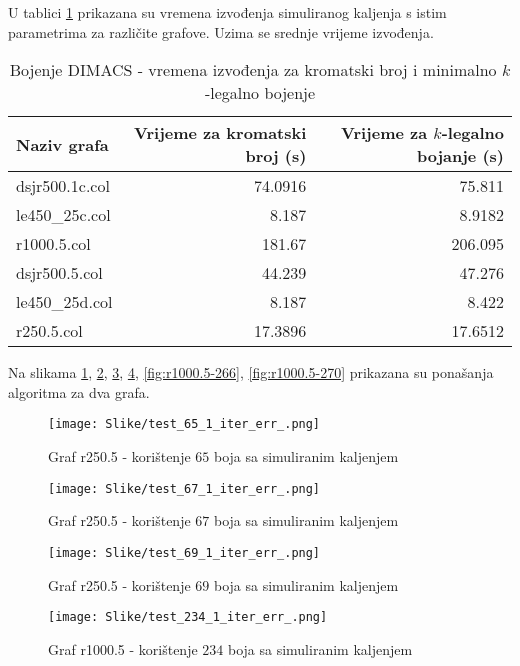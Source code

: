 \documentclass[times, utf8, diplomski, numeric]{fer}
\begin{document}
U tablici \ref{tbl:dimacs-sa-time} prikazana su vremena izvođenja simuliranog kaljenja s istim parametrima za različite grafove. Uzima se srednje vrijeme izvođenja.

\begin{table}[htb]
	\caption{Bojenje DIMACS - vremena izvođenja za kromatski broj i minimalno $k$-legalno bojenje}
	\label{tbl:dimacs-sa-time}
	\centering
	\begin{tabular}{|l||r|r|} \hline
	Naziv grafa & Vrijeme za kromatski broj (s) & Vrijeme za $k$-legalno bojanje (s) \\ \hline \hline
	dsjr500.1c.col & 74.0916 & 75.811 \\ \hline 
	le450\_25c.col & 8.187 & 8.9182 \\  \hline
	r1000.5.col & 181.67 & 206.095 \\ \hline
	dsjr500.5.col & 44.239 & 47.276  \\  \hline 
	le450\_25d.col &  8.187 & 8.422  \\ \hline
	r250.5.col & 17.3896 & 17.6512 \\ \hline
	\end{tabular}
\end{table}

Na slikama \ref{fig:r250.5-65}, \ref{fig:r250.5-67}, \ref{fig:r250.5-69}, \ref{fig:r1000.5-234}, \ref{fig:r1000.5-266}, \ref{fig:r1000.5-270} prikazana su ponašanja algoritma za dva grafa.

\begin{figure}[htb]
	\texttt{[image: Slike/test\_65\_1\_iter\_err\_.png]}
	\caption{Graf r250.5 - korištenje $65$ boja sa simuliranim kaljenjem}
	\label{fig:r250.5-65}
\end{figure}

\begin{figure}[htb]
	\texttt{[image: Slike/test\_67\_1\_iter\_err\_.png]}
	\caption{Graf r250.5 - korištenje $67$ boja sa simuliranim kaljenjem}
	\label{fig:r250.5-67}
\end{figure}

\begin{figure}[htb]
	\texttt{[image: Slike/test\_69\_1\_iter\_err\_.png]}
	\caption{Graf r250.5 - korištenje $69$ boja sa simuliranim kaljenjem}
	\label{fig:r250.5-69}
\end{figure}


\begin{figure}[htb]
	\texttt{[image: Slike/test\_234\_1\_iter\_err\_.png]}
	\caption{Graf r1000.5 - korištenje $234$ boja sa simuliranim kaljenjem}
	\label{fig:r1000.5-234}
\end{figure}
\end{document}
